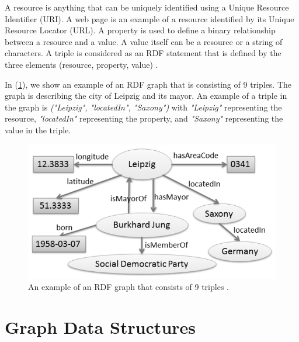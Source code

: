 {A resource is anything that can be uniquely identified using a Unique Resource Identifier (URI). A web page is an example of a resource identified by its Unique Resource Locator (URL). A property is used to define a binary relationship between a resource and a value. A value itself can be a resource or a string of characters. A triple is considered as an RDF statement that is defined by the three elements (resource, property, value) \cite{Las99,Lee2005}.



In (\ref{fig_RDF}), we show an example of an RDF graph that is consisting of 9 triples. The graph is describing the city of Leipzig and its mayor. An example of a triple in the graph is \textit{("Leipzig", "locatedIn", "Saxony")} with \textit{"Leipzig"} representing the resource, \textit{"locatedIn"} representing the property, and \textit{"Saxony"} representing the value in the triple.


\begin{figure}[H]
\centering
\includegraphics[width=15cm]{pics/RDF-Graph.png}
\caption{An example of an RDF graph that consists of 9 triples \cite{ngomo2014introduction}.}
\label{fig_RDF}
\end{figure} 

\section{Graph Data Structures}
\label{sec:StorageStructures}

}
